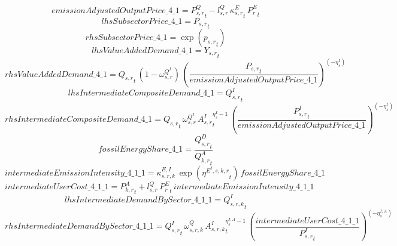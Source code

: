 \begin{dmath*}
emissionAdjustedOutputPrice\_4\_1 = {{P^Q_{s,r}}}_{t}-{{l^{Q}_{s,r}}}\, {{\kappa^{E}_{s,r}}}_{t}\, {{P^E_r}}_{t}
\end{dmath*}
\begin{dmath*}
lhsSubsectorPrice\_4\_1 = {{P_{s,r}}}_{t}
\end{dmath*}
\begin{dmath*}
rhsSubsectorPrice\_4\_1 = \exp\left({{p_{s,r}}}_{t}\right)
\end{dmath*}
\begin{dmath*}
lhsValueAddedDemand\_4\_1 = {{Y_{s,r}}}_{t}
\end{dmath*}
\begin{dmath*}
rhsValueAddedDemand\_4\_1 = {{Q_{s,r}}}_{t}\, \left(1-{{\omega^{Q^{I}}_{s,r}}}\right)\, \left(\frac{{{P_{s,r}}}_{t}}{{emissionAdjustedOutputPrice\_4\_1}}\right)^{\left(-{{\eta^{I}_{s}}}\right)}
\end{dmath*}
\begin{dmath*}
lhsIntermediateCompositeDemand\_4\_1 = {{Q^{I}_{s,r}}}_{t}
\end{dmath*}
\begin{dmath*}
rhsIntermediateCompositeDemand\_4\_1 = {{Q_{s,r}}}_{t}\, {{\omega^{Q^{I}}_{s,r}}}\, {{A^{I}_{s,r}}}_{t}^{{{\eta^{I}_{s}}}-1}\, \left(\frac{{{P^{I}_{s,r}}}_{t}}{{emissionAdjustedOutputPrice\_4\_1}}\right)^{\left(-{{\eta^{I}_{s}}}\right)}
\end{dmath*}
\begin{dmath*}
fossilEnergyShare\_4\_1 = \frac{{{Q^{D}_{s,r}}}_{t}}{{{Q^{A}_{k,r}}}_{t}}
\end{dmath*}
\begin{dmath*}
intermediateEmissionIntensity\_4\_1\_1 = {{\kappa^{E,I}_{s,r,k}}}\, \exp\left({{\eta^{E^{I},s,k,r}}}_{t}\right)\, {fossilEnergyShare\_4\_1}
\end{dmath*}
\begin{dmath*}
intermediateUserCost\_4\_1\_1 = {{P^{A}_{k,r}}}_{t}+{{l^{Q}_{s,r}}}\, {{P^E_r}}_{t}\, {intermediateEmissionIntensity\_4\_1\_1}
\end{dmath*}
\begin{dmath*}
lhsIntermediateDemandBySector\_4\_1\_1 = {{Q^{I}_{s,r,k}}}_{t}
\end{dmath*}
\begin{dmath*}
rhsIntermediateDemandBySector\_4\_1\_1 = {{Q^{I}_{s,r}}}_{t}\, {{\omega^{Q}_{s,r,k}}}\, {{A^{I}_{s,r,k}}}_{t}^{{{\eta^{I,A}_{s}}}-1}\, \left(\frac{{intermediateUserCost\_4\_1\_1}}{{{P^{I}_{s,r}}}_{t}}\right)^{\left(-{{\eta^{I,A}_{s}}}\right)}
\end{dmath*}
